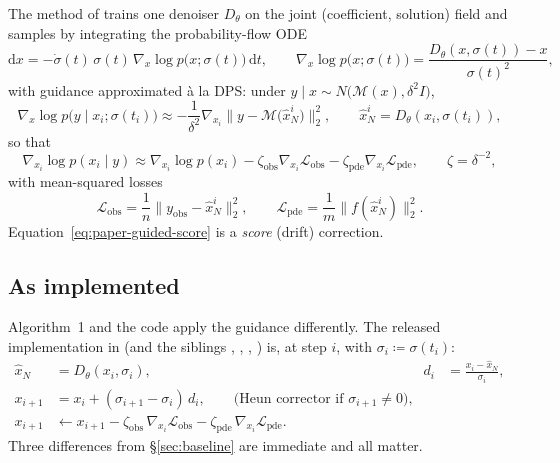 \documentclass[11pt]{article}
\newcommand{\dd}{\mathrm{d}}
\begin{document}
The method of \citet{huang2024diffusionpde} trains one denoiser $D_\theta$ on the joint
(coefficient, solution) field and samples by integrating the probability-flow ODE
\begin{equation}\label{eq:paper-ode}
  \dd x = -\dot\sigma(t)\,\sigma(t)\,\nabla_x\log p\bigl(x;\sigma(t)\bigr)\,\dd t,
  \qquad
  \nabla_x\log p\bigl(x;\sigma(t)\bigr)=\frac{D_\theta(x,\sigma(t))-x}{\sigma(t)^2},
\end{equation}
with guidance approximated \`a la DPS: under $y\mid x\sim N\!\bigl(\mathcal M(x),\delta^2 I\bigr)$,
\begin{equation}\label{eq:paper-dps}
  \nabla_x\log p\bigl(y\mid x_i;\sigma(t_i)\bigr)
  \approx -\frac{1}{\delta^2}\nabla_{x_i}\bigl\|y-\mathcal M\bigl(\hat x_N^i\bigr)\bigr\|_2^2,
  \qquad \hat x_N^i = D_\theta(x_i,\sigma(t_i)),
\end{equation}
so that
\begin{equation}\label{eq:paper-guided-score}
  \nabla_{x_i}\log p(x_i\mid y)
  \approx \nabla_{x_i}\log p(x_i)
  - \zeta_{\mathrm{obs}}\nabla_{x_i}\mathcal L_{\mathrm{obs}}
  - \zeta_{\mathrm{pde}}\nabla_{x_i}\mathcal L_{\mathrm{pde}},
  \qquad \zeta=\delta^{-2},
\end{equation}
with mean-squared losses
\begin{equation}\label{eq:paper-losses}
  \mathcal L_{\mathrm{obs}} = \frac1n\bigl\|y_{\mathrm{obs}}-\hat x_N^i\bigr\|_2^2,
  \qquad
  \mathcal L_{\mathrm{pde}} = \frac1m\bigl\|f(\hat x_N^i)\bigr\|_2^2 .
\end{equation}
Equation~\eqref{eq:paper-guided-score} is a \emph{score} (drift) correction.

\subsection{As implemented}

Algorithm~1 and the code apply the guidance differently. The released implementation in
 (and the siblings ,
, , ) is, at
step $i$, with $\sigma_i\coloneqq\sigma(t_i)$:
\begin{align}
  \hat x_N &= D_\theta(x_i,\sigma_i), & d_i &= \frac{x_i-\hat x_N}{\sigma_i},
  \label{eq:code-euler}\\[2pt]
  x_{i+1} &= x_i + (\sigma_{i+1}-\sigma_i)\,d_i,
  \qquad\text{(Heun corrector if }\sigma_{i+1}\neq0\text{),} \label{eq:code-heun}\\[2pt]
  x_{i+1} &\leftarrow x_{i+1}-\zeta_{\mathrm{obs}}\,\nabla_{x_i}\mathcal L_{\mathrm{obs}}
  -\zeta_{\mathrm{pde}}\,\nabla_{x_i}\mathcal L_{\mathrm{pde}} . \label{eq:code-flat}
\end{align}
Three differences from \S\ref{sec:baseline} are immediate and all matter.
\end{document}
